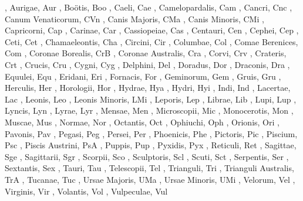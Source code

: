 , Aurigae, Aur
, Bo{\"o}tis, Boo
, Caeli, Cae
, Camelopardalis, Cam
, Cancri, Cnc
, Canum Venaticorum, CVn
, Canis Majoris, CMa
, Canis Minoris, CMi
, Capricorni, Cap
, Carinae, Car
, Cassiopeiae, Cas
, Centauri, Cen
, Cephei, Cep
, Ceti, Cet
, Chamaeleontis, Cha
, Circini, Cir
, Columbae, Col
, Comae Berenices, Com
, Coronae Borealis, CrB
, Coronae Australis, Cra
, Corvi, Crv
, Crateris, Crt
, Crucis, Cru
, Cygni, Cyg
, Delphini, Del
, Doradus, Dor
, Draconis, Dra
, Equulei, Equ
, Eridani, Eri
, Fornacis, For
, Geminorum, Gem
, Gruis, Gru
, Herculis, Her
, Horologii, Hor
, Hydrae, Hya
, Hydri, Hyi
, Indi, Ind
, Lacertae, Lac
, Leonis, Leo
, Leonis Minoris, LMi
, Leporis, Lep
, Librae, Lib
, Lupi, Lup
, Lyncis, Lyn
, Lyrae, Lyr
, Mensae, Men
, Microscopii, Mic
, Monocerotis, Mon
, Muscae, Mus
, Normae, Nor
, Octantis, Oct
, Ophiuchi, Oph
, Orionis, Ori
, Pavonis, Pav
, Pegasi, Peg
, Persei, Per
, Phoenicis, Phe
, Pictoris, Pic
, Piscium, Psc
, Piscis Austrini, PsA
, Puppis, Pup
, Pyxidis, Pyx
, Reticuli, Ret
, Sagittae, Sge
, Sagittarii, Sgr
, Scorpii, Sco
, Sculptoris, Scl
, Scuti, Sct
, Serpentis, Ser
, Sextantis, Sex
, Tauri, Tau
, Telescopii, Tel
, Trianguli, Tri
, Trianguli Australis, TrA
, Tucanae, Tuc
, Ursae Majoris, UMa
, Ursae Minoris, UMi
, Velorum, Vel
, Virginis, Vir
, Volantis, Vol
, Vulpeculae, Vul
\singlecolumn
\vfil\eject
\endgroup
\endgroup

